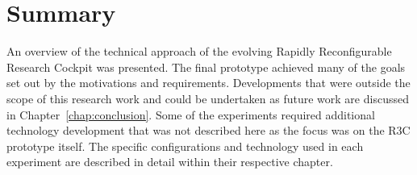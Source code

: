 \section{Summary}

An overview of the technical approach of the evolving Rapidly Reconfigurable Research Cockpit was presented.
The final prototype achieved many of the goals set out by the motivations and requirements.
Developments that were outside the scope of this research work and could be undertaken as future work are discussed in Chapter~\ref{chap:conclusion}.
Some of the experiments required additional technology development that was not described here as the focus was on the R3C prototype itself.
The specific configurations and technology used in each experiment are described in detail within their respective chapter.
